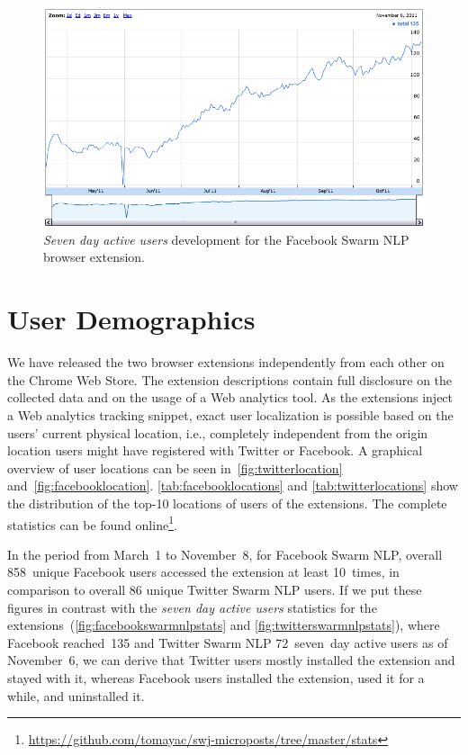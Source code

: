 \documentclass{iosart2c}
\begin{document}
\begin{figure}
\centering
\includegraphics[width=1.0\linewidth]{./resources/facebookswarmnlpstats.png}
\caption{\textit{Seven day active users} development for the Facebook Swarm NLP browser extension.}
\label{fig:facebookswarmnlpstats}
\end{figure}

\section{User Demographics} \label{sec:userdemographics}
We have released the two browser extensions independently from each other on the Chrome Web Store.
The extension descriptions contain full disclosure on the collected data and on the usage of a Web analytics tool.
As the extensions inject a Web analytics tracking snippet, exact user localization is possible based on the users' current physical location, i.e., completely independent from the origin location users might have registered with Twitter or Facebook.
A graphical overview of user locations can be seen in~\autoref{fig:twitterlocation} and~\autoref{fig:facebooklocation}.
\autoref{tab:facebooklocations} and \autoref{tab:twitterlocations} show the distribution of the top-10 locations of users of the extensions.
The complete statistics can be found online\footnote{\url{https://github.com/tomayac/swj-microposts/tree/master/stats}}.

In the period from March~1 to November~8, for Facebook Swarm NLP, overall 858~unique Facebook users accessed the extension at least 10~times, in comparison to overall 86 unique Twitter Swarm NLP users.
If we put these figures in contrast with the \emph{seven day active users} statistics for the extensions~(\autoref{fig:facebookswarmnlpstats} and \autoref{fig:twitterswarmnlpstats}), where Facebook reached~135 and Twitter Swarm NLP 72~seven~day active users as of November~6, we can derive that Twitter users mostly installed the extension and stayed with it, whereas Facebook users installed the extension, used it for a while, and uninstalled it.
\end{document}

